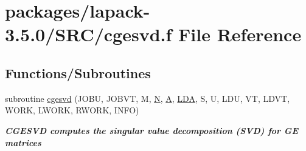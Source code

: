 \hypertarget{cgesvd_8f}{}\section{packages/lapack-\/3.5.0/\+S\+R\+C/cgesvd.f File Reference}
\label{cgesvd_8f}
\subsection*{Functions/\+Subroutines}
\begin{DoxyCompactItemize}
\item 
subroutine \hyperlink{group__complexGEsing_ga0ed22d535ec7d84e8bf4f2f885df8c5c}{cgesvd} (J\+O\+B\+U, J\+O\+B\+V\+T, M, \hyperlink{polmisc_8c_a0240ac851181b84ac374872dc5434ee4}{N}, \hyperlink{classA}{A}, \hyperlink{example__user_8c_ae946da542ce0db94dced19b2ecefd1aa}{L\+D\+A}, S, U, L\+D\+U, V\+T, L\+D\+V\+T, W\+O\+R\+K, L\+W\+O\+R\+K, R\+W\+O\+R\+K, I\+N\+F\+O)
\begin{DoxyCompactList}\small\item\em {\bfseries  C\+G\+E\+S\+V\+D computes the singular value decomposition (S\+V\+D) for G\+E matrices} \end{DoxyCompactList}\end{DoxyCompactItemize}
